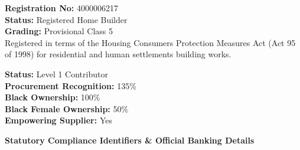 \documentclass[a4paper,11pt]{article}
\providecommand{\faAward}{\faCertificate}
\begin{document}
\hfill
\begin{minipage}[t]{0.34\textwidth}
    \vspace{0pt}
    \begin{tcolorbox}[
        enhanced, colback=white, colframe=mhlightgray, boxrule=0.8pt, arc=4pt,
        title={\bfseries\color{white}\faBuilding\ NHBRC Registration},
        colbacktitle=mhnavy, fonttitle=\bfseries\small,
        left=7pt, right=7pt, top=6pt, bottom=6pt,
        drop shadow=black!4
    ]
        {\fontsize{7.8pt}{10.8pt}\selectfont\color{mhtext}
        \textbf{Registration No:} 4000006217\\
        \textbf{Status:} Registered Home Builder\\
        \textbf{Grading:} Provisional Class 5\\
        Registered in terms of the Housing Consumers Protection Measures Act (Act 95 of 1998) for residential and human settlements building works.
        }
    \end{tcolorbox}

    \vspace{0.16cm}

    \begin{tcolorbox}[
        enhanced, colback=mhoffwhite, colframe=mhnavy, boxrule=0.8pt, arc=4pt,
        title={\bfseries\color{white}\faAward\ B-BBEE Credentials},
        colbacktitle=mhnavy, fonttitle=\bfseries\small,
        left=7pt, right=7pt, top=6pt, bottom=6pt,
        drop shadow=black!4
    ]
        {\fontsize{7.8pt}{10.8pt}\selectfont\color{mhtext}
        \textbf{Status:} Level 1 Contributor\\
        \textbf{Procurement Recognition:} 135\%\\
        \textbf{Black Ownership:} 100\%\\
        \textbf{Black Female Ownership:} 50\%\\
        \textbf{Empowering Supplier:} Yes
        }
    \end{tcolorbox}
\end{minipage}

\vfill

{\large\bfseries\color{mhnavy} Statutory Compliance Identifiers \& Official Banking Details}
\vspace{0.08cm}
\end{document}
